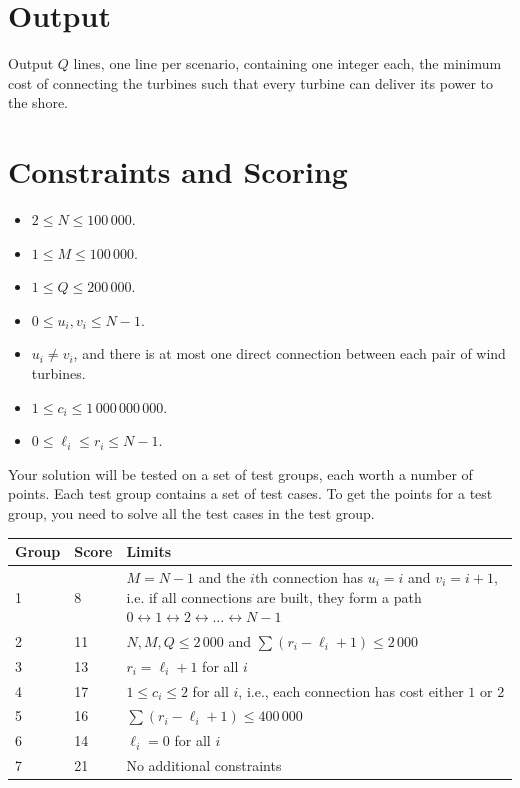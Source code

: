 \section*{Output}
Output $Q$ lines, one line per scenario, containing one integer each, the minimum cost of connecting the turbines such that every turbine can deliver its power to the shore.

\section*{Constraints and Scoring}
\begin{itemize}
\item $2 \le N\le 100\,000$.
\item $1 \le M\le 100\,000$.
\item $1 \le Q\le 200\,000$.
\item $0 \le u_i,v_i \le N-1$.
\item $u_i \ne v_i$, and there is at most one direct connection between each pair of wind turbines.
\item $1 \le c_i \le 1\,000\,000\,000$.
\item $0 \le \ell_i\le r_i \le N-1$.
\end{itemize}

Your solution will be tested on a set of test groups, each worth a number of points. Each test group contains a set of test cases. To get the points for a test group, you need to solve all the test cases in the test group.


\begin{tabular}{|l|l|l|}
\hline
Group  &  Score  &  Limits \\
\hline
 1 & 8 & $M=N-1$ and the $i$th connection has $u_i=i$ and $v_i=i+1$, i.e. if all connections are built, they form a path $0 \leftrightarrow 1 \leftrightarrow 2 \leftrightarrow \ldots \leftrightarrow N-1$   \\
\hline
  2 & 11 & $N,M,Q\le 2\,000$ and $\sum(r_i-\ell_i+1) \le 2\,000$   \\
\hline
  3 & 13 & $r_i=\ell_i+1$ for all $i$   \\
\hline
  4 & 17 & $1\le c_i \le 2$ for all $i$, i.e., each connection has cost either $1$ or $2$   \\
\hline
  5 & 16 & $\sum(r_i-\ell_i+1)\le 400\,000$   \\
\hline
  6 & 14 & $\ell_i=0$ for all $i$   \\
\hline
  7 & 21 & No additional constraints   \\
\hline
\end{tabular}
